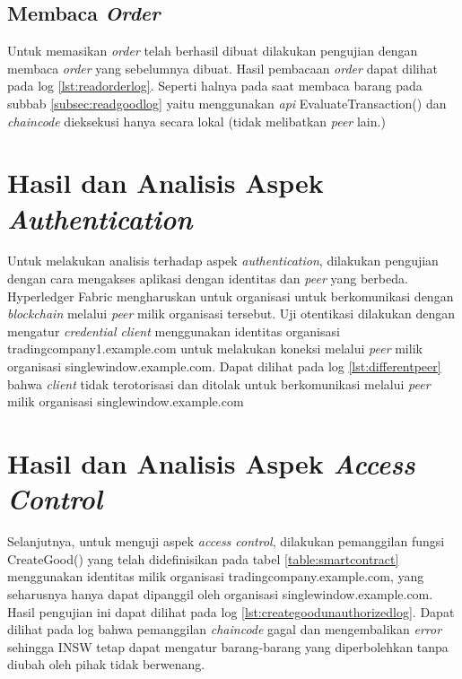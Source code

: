 \subsection{Membaca \textit{Order}}
Untuk memasikan \textit{order} telah berhasil dibuat dilakukan pengujian dengan membaca \textit{order} yang sebelumnya dibuat. Hasil pembacaan \textit{order} dapat dilihat pada log \ref{lst:readorderlog}. Seperti halnya pada saat membaca barang pada subbab \ref{subsec:readgoodlog} yaitu menggunakan \textit{api} EvaluateTransaction() dan \textit{chaincode} dieksekusi hanya secara lokal (tidak melibatkan \textit{peer} lain.)



\section{Hasil dan Analisis Aspek \textit{Authentication}}
Untuk melakukan analisis terhadap aspek \textit{authentication}, dilakukan pengujian dengan cara mengakses aplikasi dengan identitas dan \textit{peer} yang berbeda. Hyperledger Fabric mengharuskan untuk organisasi untuk berkomunikasi dengan \textit{blockchain} melalui \textit{peer} milik organisasi tersebut. Uji otentikasi dilakukan dengan mengatur \textit{credential client}  menggunakan identitas organisasi tradingcompany1.example.com untuk melakukan koneksi melalui \textit{peer} milik organisasi singlewindow.example.com. Dapat dilihat pada log \ref{lst:differentpeer} bahwa \textit{client} tidak terotorisasi dan ditolak untuk berkomunikasi melalui \textit{peer} milik organisasi singlewindow.example.com



\section{Hasil dan Analisis Aspek \textit{Access Control}}
Selanjutnya, untuk menguji aspek \textit{access control}, dilakukan pemanggilan fungsi CreateGood() yang telah didefinisikan pada tabel \ref{table:smartcontract} menggunakan identitas milik organisasi tradingcompany.example.com, yang seharusnya hanya dapat dipanggil oleh organisasi singlewindow.example.com. Hasil pengujian ini dapat dilihat pada log \ref{lst:creategoodunauthorizedlog}. Dapat dilihat pada log bahwa pemanggilan \textit{chaincode} gagal dan mengembalikan \textit{error} sehingga INSW tetap dapat mengatur barang-barang yang diperbolehkan tanpa diubah oleh pihak tidak berwenang.

